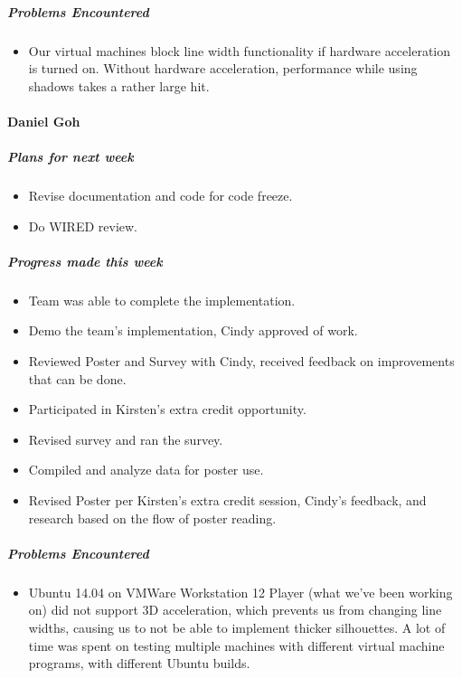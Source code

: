 {\subparagraph{Problems Encountered}
\begin{itemize}
  \item Our virtual machines block line width functionality if hardware acceleration is turned on. Without hardware acceleration, performance while using shadows takes a rather large hit.
\end{itemize}

\vspace{3mm}
\paragraph{Daniel Goh}
\subparagraph{Plans for next week}
\begin{itemize}
  \item Revise documentation and code for code freeze.
  \item Do WIRED review.
\end{itemize}

\subparagraph{Progress made this week}
\begin{itemize}
  \item Team was able to complete the implementation.
  \item Demo the team's implementation, Cindy approved of work.
  \item Reviewed Poster and Survey with Cindy, received feedback on improvements that can be done.
  \item Participated in Kirsten's extra credit opportunity.
  \item Revised survey and ran the survey.
  \item Compiled and analyze data for poster use.
  \item Revised Poster per Kirsten's extra credit session, Cindy's feedback, and research based on the flow of poster reading.
\end{itemize}

\subparagraph{Problems Encountered}
\begin{itemize}
  \item Ubuntu 14.04 on VMWare Workstation 12 Player (what we've been working on) did not support 3D acceleration, which prevents us from changing line widths, causing us to not be able to implement thicker silhouettes. A lot of time was spent on testing multiple machines with different virtual machine programs, with different Ubuntu builds.
\end{itemize}

}

\newpage

